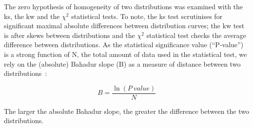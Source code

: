 The zero hypothesis of homogeneity of two distributions was examined with the \gls{ks}, the \gls{kw} and the \({\chi}^{2}\) statistical tests.
To note, the \gls{ks} test scrutinises for significant maximal absolute differences between distribution curves; the \gls{kw} test is after skews between distributions and the \({\chi}^{2}\) statistical test checks the average difference between distributions.
As the statistical significance value (``P‑value'') is a strong function of N, the total amount of data used in the statistical test, we rely on the (absolute) Bahadur slope (B) as a measure of distance between two distributions~\cite{Bahadur1967, Bahadur1971}:

\begin{equation} \label{eq:bahadur}
B=\frac{\ln(P~value)}{N}
\end{equation}

The larger the absolute Bahadur slope, the greater the difference between the two distributions.

